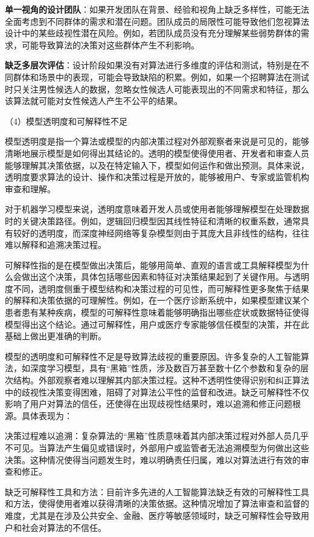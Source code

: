 \textbf{单一视角的设计团队}：如果开发团队在背景、经验和视角上缺乏多样性，可能无法全面考虑到不同群体的需求和潜在问题。团队成员的局限性可能导致他们忽视算法设计中的某些歧视性潜在风险。例如，若团队成员没有充分理解某些弱势群体的需求，可能导致算法的决策对这些群体产生不利影响。

\textbf{缺乏多层次评估}：设计阶段如果没有对算法进行多维度的评估和测试，特别是在不同群体和场景中的表现，可能会导致缺陷的积累。例如，如果一个招聘算法在测试时只关注男性候选人的数据，忽略女性候选人可能表现出的不同需求和特征，那么该算法就可能对女性候选人产生不公平的结果。

（4）模型透明度和可解释性不足

模型透明度是指一个算法或模型的内部决策过程对外部观察者来说是可见的，能够清晰地展示模型是如何得出其结论的。透明的模型使得使用者、开发者和审查人员能够理解其决策依据，以及在特定输入下，模型如何运作和做出预测。具体来说，透明度要求算法的设计、操作和决策过程是开放的，能够被用户、专家或监管机构审查和理解。

对于机器学习模型来说，透明度意味着开发人员或使用者能够理解模型在处理数据时的关键决策路径。例如，逻辑回归模型因其线性特征和清晰的权重系数，通常具有较好的透明度，而深度神经网络等复杂模型则由于其庞大且非线性的结构，往往难以解释和追溯决策过程。

可解释性指的是在模型做出决策后，能够用简单、直观的语言或工具解释模型为什么会做出这个决策，具体包括哪些因素和特征对决策结果起到了关键作用。与透明度不同，透明度侧重于模型结构和决策过程的可见性，而可解释性更多聚焦于结果的解释和决策依据的可理解性。例如，在一个医疗诊断系统中，如果模型建议某个患者患有某种疾病，模型的可解释性意味着能够明确指出哪些症状或数据特征使得模型得出这个结论。通过可解释性，用户或医疗专家能够信任模型的决策，并在此基础上做出更准确的判断。

模型的透明度和可解释性不足是导致算法歧视的重要原因。许多复杂的人工智能算法，如深度学习模型，具有“黑箱”性质，涉及数百万甚至数十亿个参数和复杂的层次结构。外部观察者难以理解其内部决策过程。这种不透明性使得识别和纠正算法中的歧视性决策变得困难，阻碍了对算法公平性的监督和改进。缺乏可解释性不仅影响了用户对算法的信任，还使得在出现歧视性结果时，难以追溯和修正问题根源。具体表现为：

决策过程难以追溯：复杂算法的“黑箱”性质意味着其内部决策过程对外部人员几乎不可见。当算法产生偏见或错误时，外部用户或监管者无法追溯模型为何做出这些决策。这种情况使得当问题发生时，难以明确责任归属，难以对算法进行有效的审查和修正。

缺乏可解释性工具和方法：目前许多先进的人工智能算法缺乏有效的可解释性工具和方法，使得使用者难以获得清晰的决策依据。这种情况增加了算法审查和监督的难度，尤其是在涉及公共安全、金融、医疗等敏感领域时，缺乏可解释性会导致用户和社会对算法的不信任。

